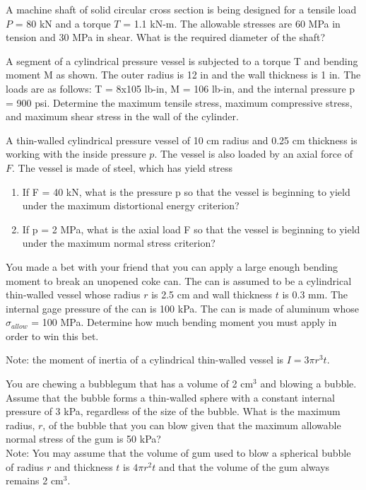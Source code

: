 \documentclass[
10pt,
a4paper,
openany,
svgnames,
]{book} %
\newcommand{\exercise}{%
\item\label{lab:\arabic{chapter}.\arabic{exercisesi}}  %
}
\begin{document}
\begin{exercises}
  \exercise A machine shaft of solid circular cross section is being designed for a tensile load $P$ = 80 kN and a torque $T$ = 1.1 kN-m. The allowable stresses are 60 MPa in tension and 30 MPa in shear. What is the required diameter of the shaft?

  \exercise A segment of a cylindrical pressure vessel is subjected to a torque T and bending moment M as shown. The outer radius is 12 in and the wall thickness is 1 in. The loads are as follows: T = 8x105 lb-in, M = 106 lb-in, and the internal pressure p = 900 psi. Determine the maximum tensile stress, maximum compressive stress, and maximum shear stress in the wall of the cylinder.

  \exercise A thin-walled cylindrical pressure vessel of 10 cm radius and 0.25 cm thickness is working with the inside pressure $p$. The vessel is also loaded by an axial force of $F$. The vessel is made of steel, which has yield stress
  \begin{enumerate}
  \item If F = 40 kN, what is the pressure p so that the vessel is beginning to yield under the maximum distortional energy criterion?
  \item If p = 2 MPa, what is the axial load F so that the vessel is beginning to yield under the maximum normal stress criterion?
  \end{enumerate}

  \exercise You made a bet with your friend that you can apply a large enough bending moment to break an unopened coke can. The can is assumed to be a cylindrical thin-walled vessel whose radius $r$ is 2.5 cm and wall thickness $t$ is 0.3 mm. The internal gage pressure of the can is 100 kPa. The can is made of aluminum whose $\sigma_{allow}$ = 100 MPa. Determine how much bending moment you must apply in order to win this bet.
  
  Note: the moment of inertia of a cylindrical thin-walled vessel is $I = 3 \pi r^3 t$.

  \exercise You are chewing a bubblegum that has a volume of 2 cm$^3$ and
  blowing a bubble. Assume that the bubble forms a thin-walled sphere
  with a constant internal pressure of 3 kPa, regardless of the size
  of the bubble. What is the maximum radius, $r$, of the bubble that
  you can blow given that the maximum allowable normal stress of the
  gum is 50 kPa? \\
  Note: You may assume that the volume of gum used to blow a spherical
  bubble of radius $r$ and thickness $t$ is $4\pi r^2 t$ and that the
  volume of the gum always remains 2 cm$^3$.


\end{exercises}
\end{document}
